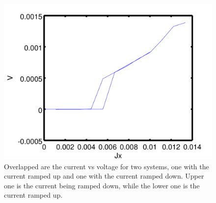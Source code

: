 \begin{figure}[htbp]
\begin{center}
\includegraphics[scale=.50]{Hysteresis.png}
\caption{ Overlapped are the current vs voltage for two systems, one with the current ramped up and one with the current ramped down. Upper one is the current being ramped down, while the lower one is the current ramped up.}
\label{hysteresis}
\end{center}
\end{figure}


